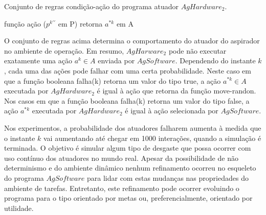 \begin{algorithm}[h!]
    \caption{\label{alg:exp2-behaviour} Conjunto de regras condição-ação do programa atuador $AgHardware_2$.}
    função ação ($p^{k\prime\prime}$ em P) retorna $a^{*k}$ em A\\
\end{algorithm}

O conjunto de regras acima determina o comportamento do atuador do aspirador no ambiente de operação. Em resumo, $AgHarware_2$ pode não executar exatamente uma ação $a^k \in A$ enviada por $AgSoftware$. Dependendo do instante $k$, cada uma das ações pode falhar com uma certa probabilidade. Neste caso em que a função booleana falha(k) retorna um valor do tipo true, a ação $a^{*k} \in A$ executada por $AgHardware_2$ é igual à ação que retorna da função move-randon. Nos casos em que a função booleana falha(k) retorna um valor do tipo false, a ação $a^{*k}$ executada por $AgHardware_2$ é igual à ação selecionada por $AgSoftware$.

Nos experimentos, a probabilidade dos atuadores falharem aumenta à medida que o instante $k$ vai aumentando até chegar em 1000 interações, quando a simulação é terminada. O objetivo é simular algum tipo de desgaste que possa ocorrer com uso contínuo dos atuadores no mundo real. Apesar da possibilidade de não determinismo e do ambiente dinâmico nenhum refinamento ocorreu no esqueleto do programa $AgSoftware$ para lidar com estas mudanças nas propriedades do ambiente de tarefas. Entretanto, este refinamento pode ocorrer evoluindo o programa para o tipo orientado por metas ou, preferencialmente, orientado por utilidade. 

